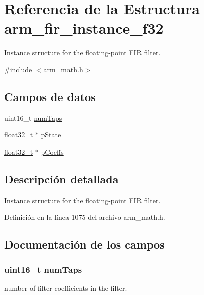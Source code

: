 \hypertarget{structarm__fir__instance__f32}{}\section{Referencia de la Estructura arm\+\_\+fir\+\_\+instance\+\_\+f32}
\label{structarm__fir__instance__f32}


Instance structure for the floating-\/point F\+IR filter.  




{\ttfamily \#include $<$arm\+\_\+math.\+h$>$}

\subsection*{Campos de datos}
\begin{DoxyCompactItemize}
\item 
uint16\+\_\+t \hyperlink{structarm__fir__instance__f32_a751941891e47f522a7f5375fe8990aac}{num\+Taps}
\item 
\hyperlink{arm__math_8h_a4611b605e45ab401f02cab15c5e38715}{float32\+\_\+t} $\ast$ \hyperlink{structarm__fir__instance__f32_a335c87e6fdc4b96601d95a5de8b9c463}{p\+State}
\item 
\hyperlink{arm__math_8h_a4611b605e45ab401f02cab15c5e38715}{float32\+\_\+t} $\ast$ \hyperlink{structarm__fir__instance__f32_aacbb8dd8eeba4b21fc2bb40076405ee3}{p\+Coeffs}
\end{DoxyCompactItemize}


\subsection{Descripción detallada}
Instance structure for the floating-\/point F\+IR filter. 

Definición en la línea 1075 del archivo arm\+\_\+math.\+h.



\subsection{Documentación de los campos}
\subsubsection[{\texorpdfstring{num\+Taps}{numTaps}}]{\setlength{\rightskip}{0pt plus 5cm}uint16\+\_\+t num\+Taps}\hypertarget{structarm__fir__instance__f32_a751941891e47f522a7f5375fe8990aac}{}\label{structarm__fir__instance__f32_a751941891e47f522a7f5375fe8990aac}
number of filter coefficients in the filter. 

